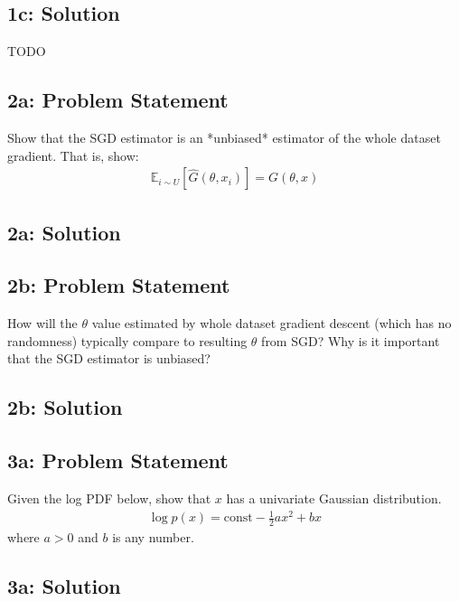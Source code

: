 \documentclass[12pt]{article}
\newcommand{\officialdirections}[1]{{\color{blue} #1}}
\begin{document}
\subsection{1c: Solution}
TODO




\newpage
\officialdirections{
\subsection*{2a: Problem Statement}

Show that the SGD estimator is an *unbiased* estimator of the whole dataset gradient. That is, show:
\begin{align}
\mathbb{E}_{i \sim U}[ \hat{G}(\theta, x_i) ] = G(\theta, x)
\end{align}
}

\subsection{2a: Solution}




\newpage
\officialdirections{
\subsection*{2b: Problem Statement}
How will the $\theta$ value estimated by whole dataset gradient descent (which has no randomness) typically compare to resulting $\theta$ from SGD? Why is it important that the SGD estimator is unbiased?
}

\subsection{2b: Solution}






\newpage
\officialdirections{
\subsection*{3a: Problem Statement}
Given the log PDF below, show that $x$ has a univariate Gaussian distribution.
\begin{align}
\log p(x) = \text{const} - \frac{1}{2} a x^2 + bx
\end{align}
where $a > 0$ and $b$ is any number.
}

\subsection{3a: Solution}
\end{document}
